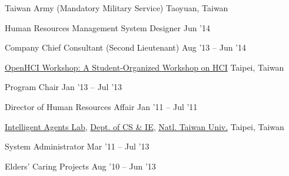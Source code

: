 \documentclass[10pt, a4paper]{article} %
\begin{document}

\headedsection
{Taiwan Army (Mandatory Military Service)}
{Taoyuan, Taiwan}{

	\headedsubsection
	{Human Resources Management System Designer}
	{Jun '14}
	{}

	\headedsubsection
	{Company Chief Consultant (Second Lieutenant)}
	{Aug '13 -- Jun '14}
	{}

}


\headedsection
{\href{http://www.openhci.com/}{OpenHCI Workshop: A Student-Organized Workshop on HCI}}
{Taipei, Taiwan}{

	\headedsubsection
	{Program Chair}
	{Jan '13 -- Jul '13}
	{}

	\headedsubsection
	{Director of Human Resources Affair}
	{Jan '11 -- Jul '11}
	{}

}


\headedsection
{\href{http://agent.csie.ntu.edu.tw/}{Intelligent Agents Lab}, 
 \href{http://www.csie.ntu.edu.tw}{Dept. of CS \& IE},
 \href{http://www.ntu.edu.tw}{Natl. Taiwan Univ.}}
{Taipei, Taiwan}{

	\headedsubsection
	{System Administrator}
	{Mar '11 -- Jul '13}
	{}

	\headedsubsection
	{Elders' Caring Projects}
	{Aug '10 -- Jun '13}
	{}
}

\end{document}
